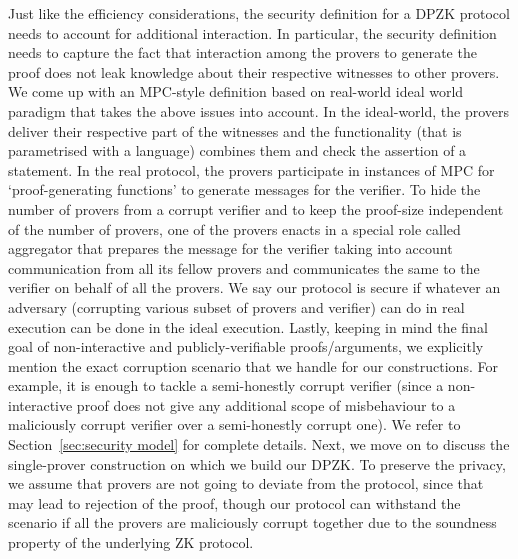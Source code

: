 
Just like the efficiency considerations, the security definition for a DPZK
protocol needs to account for additional interaction. In particular, the
security definition needs to capture the fact that interaction among the provers
to generate the proof does not leak knowledge about their respective witnesses
to other provers. 
We come up with an MPC-style definition based on real-world ideal world paradigm \cite{Canetti00,Goldreich2001,Lindell17,CohenL14}  that takes the above issues into account. In the ideal-world, the provers deliver their respective part of the witnesses and the functionality (that is parametrised with a language) combines them and check the assertion of a statement. In the real protocol,  the provers participate in  instances of MPC for `proof-generating functions' to generate messages for the verifier. To hide the number of provers from a corrupt verifier and to keep the proof-size  independent of the number of provers, one of the provers enacts in a special role called aggregator   that prepares the message for the verifier taking into account communication from all its fellow provers and communicates the same to the verifier on behalf of all the provers. We say our protocol is secure if whatever an adversary (corrupting various subset of provers and verifier) can do in real execution can be done in the ideal execution. Lastly, keeping in mind the final goal of non-interactive and publicly-verifiable proofs/arguments, we explicitly mention the exact corruption scenario that we handle for our constructions.  For example, it is enough to tackle a semi-honestly corrupt verifier (since a non-interactive proof does not give any additional scope of misbehaviour to a maliciously corrupt verifier  over a semi-honestly corrupt one).  We refer to Section~\ref{sec:security model} for complete details. Next, we move on to discuss the single-prover construction on which we build our DPZK. 
To preserve the privacy, we assume that provers are not going to deviate from the protocol, since that may lead to rejection of the proof, though our protocol can withstand the scenario if all the provers are maliciously corrupt together due to the soundness property of the underlying ZK protocol.%

